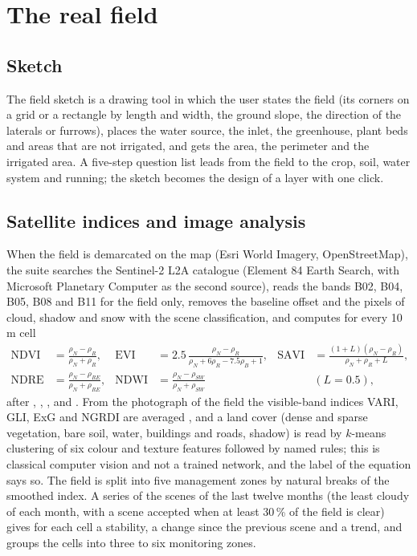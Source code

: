 \section{The real field}
\subsection{Sketch}
The field sketch is a drawing tool in which the user states the field (its corners on a grid or a rectangle by length and width, the ground slope, the direction of the laterals or furrows), places the water source, the inlet, the greenhouse, plant beds and areas that are not irrigated, and gets the area, the perimeter and the irrigated area. A five-step question list leads from the field to the crop, soil, water system and running; the sketch becomes the design of a layer with one click.

\subsection{Satellite indices and image analysis}
When the field is demarcated on the map (Esri World Imagery, OpenStreetMap), the suite searches the Sentinel-2 L2A catalogue (Element 84 Earth Search, with Microsoft Planetary Computer as the second source), reads the bands B02, B04, B05, B08 and B11 for the field only, removes the baseline offset and the pixels of cloud, shadow and snow with the scene classification, and computes for every 10\,m cell
\begin{equation}\label{eq:idx}
\begin{aligned}
\mathrm{NDVI}&=\frac{\rho_N-\rho_R}{\rho_N+\rho_R}, & \mathrm{EVI}&=2.5\,\frac{\rho_N-\rho_R}{\rho_N+6\rho_R-7.5\rho_B+1}, & \mathrm{SAVI}&=\frac{(1+L)(\rho_N-\rho_R)}{\rho_N+\rho_R+L},\\
\mathrm{NDRE}&=\frac{\rho_N-\rho_{RE}}{\rho_N+\rho_{RE}}, & \mathrm{NDWI}&=\frac{\rho_N-\rho_{SW}}{\rho_N+\rho_{SW}} & &(L=0.5),
\end{aligned}
\end{equation}
after \citet{Rouse1974}, \citet{Huete2002}, \citet{Huete1988}, \citet{Barnes2000} and \citet{Gao1996}. From the photograph of the field the visible-band indices VARI, GLI, ExG and NGRDI are averaged \citep{Gitelson2002,Woebbecke1995}, and a land cover (dense and sparse vegetation, bare soil, water, buildings and roads, shadow) is read by $k$-means clustering of six colour and texture features followed by named rules; this is classical computer vision and not a trained network, and the label of the equation says so. The field is split into five management zones by natural breaks of the smoothed index. A series of the scenes of the last twelve months (the least cloudy of each month, with a scene accepted when at least 30\,\% of the field is clear) gives for each cell a stability, a change since the previous scene and a trend, and groups the cells into three to six monitoring zones.

